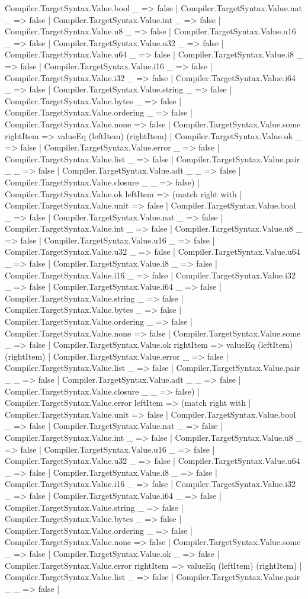 \documentclass[11pt]{article}
\begin{document}
Compiler.TargetSyntax.Value.bool \_ => false | Compiler.TargetSyntax.Value.nat \_ => false | Compiler.TargetSyntax.Value.int \_ => false | Compiler.TargetSyntax.Value.u8 \_ => false | Compiler.TargetSyntax.Value.u16 \_ => false | Compiler.TargetSyntax.Value.u32 \_ => false | Compiler.TargetSyntax.Value.u64 \_ => false | Compiler.TargetSyntax.Value.i8 \_ => false | Compiler.TargetSyntax.Value.i16 \_ => false | Compiler.TargetSyntax.Value.i32 \_ => false | Compiler.TargetSyntax.Value.i64 \_ => false | Compiler.TargetSyntax.Value.string \_ => false | Compiler.TargetSyntax.Value.bytes \_ => false | Compiler.TargetSyntax.Value.ordering \_ => false | Compiler.TargetSyntax.Value.none => false | Compiler.TargetSyntax.Value.some rightItem => valueEq (leftItem) (rightItem) | Compiler.TargetSyntax.Value.ok \_ => false | Compiler.TargetSyntax.Value.error \_ => false | Compiler.TargetSyntax.Value.list \_ => false | Compiler.TargetSyntax.Value.pair \_ \_ => false | Compiler.TargetSyntax.Value.adt \_ \_ => false | Compiler.TargetSyntax.Value.closure \_ \_ => false) | Compiler.TargetSyntax.Value.ok leftItem => (match right with | Compiler.TargetSyntax.Value.unit => false | Compiler.TargetSyntax.Value.bool \_ => false | Compiler.TargetSyntax.Value.nat \_ => false | Compiler.TargetSyntax.Value.int \_ => false | Compiler.TargetSyntax.Value.u8 \_ => false | Compiler.TargetSyntax.Value.u16 \_ => false | Compiler.TargetSyntax.Value.u32 \_ => false | Compiler.TargetSyntax.Value.u64 \_ => false | Compiler.TargetSyntax.Value.i8 \_ => false | Compiler.TargetSyntax.Value.i16 \_ => false | Compiler.TargetSyntax.Value.i32 \_ => false | Compiler.TargetSyntax.Value.i64 \_ => false | Compiler.TargetSyntax.Value.string \_ => false | Compiler.TargetSyntax.Value.bytes \_ => false | Compiler.TargetSyntax.Value.ordering \_ => false | Compiler.TargetSyntax.Value.none => false | Compiler.TargetSyntax.Value.some \_ => false | Compiler.TargetSyntax.Value.ok rightItem => valueEq (leftItem) (rightItem) | Compiler.TargetSyntax.Value.error \_ => false | Compiler.TargetSyntax.Value.list \_ => false | Compiler.TargetSyntax.Value.pair \_ \_ => false | Compiler.TargetSyntax.Value.adt \_ \_ => false | Compiler.TargetSyntax.Value.closure \_ \_ => false) | Compiler.TargetSyntax.Value.error leftItem => (match right with | Compiler.TargetSyntax.Value.unit => false | Compiler.TargetSyntax.Value.bool \_ => false | Compiler.TargetSyntax.Value.nat \_ => false | Compiler.TargetSyntax.Value.int \_ => false | Compiler.TargetSyntax.Value.u8 \_ => false | Compiler.TargetSyntax.Value.u16 \_ => false | Compiler.TargetSyntax.Value.u32 \_ => false | Compiler.TargetSyntax.Value.u64 \_ => false | Compiler.TargetSyntax.Value.i8 \_ => false | Compiler.TargetSyntax.Value.i16 \_ => false | Compiler.TargetSyntax.Value.i32 \_ => false | Compiler.TargetSyntax.Value.i64 \_ => false | Compiler.TargetSyntax.Value.string \_ => false | Compiler.TargetSyntax.Value.bytes \_ => false | Compiler.TargetSyntax.Value.ordering \_ => false | Compiler.TargetSyntax.Value.none => false | Compiler.TargetSyntax.Value.some \_ => false | Compiler.TargetSyntax.Value.ok \_ => false | Compiler.TargetSyntax.Value.error rightItem => valueEq (leftItem) (rightItem) | Compiler.TargetSyntax.Value.list \_ => false | Compiler.TargetSyntax.Value.pair \_ \_ => false | 
\end{document}
